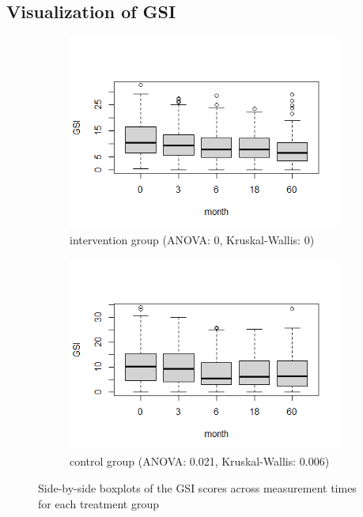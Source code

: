 \subsection{Visualization of GSI}

\begin{figure}[H]
\begin{subfigure}{.5\textwidth}
  \centering
  \includegraphics[width=1\linewidth]{../../plots/box_over_time_treatment.png}
  \caption{intervention group (ANOVA: 0, Kruskal-Wallis: 0)}
\end{subfigure}
\hfill
\begin{subfigure}{.5\textwidth}
  \centering
  \includegraphics[width=1\linewidth]{../../plots/box_over_time_control.png}
  \caption{control group (ANOVA: 0.021, Kruskal-Wallis: 0.006)}
\end{subfigure}
\caption{Side-by-side boxplots of the GSI scores across measurement times for each treatment group}
\label{fig:boxplot.over.time}
\end{figure}

